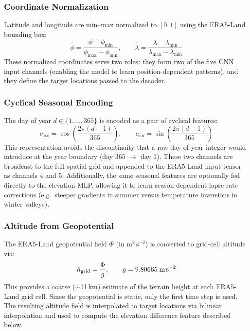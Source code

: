 \subsubsection{Coordinate Normalization}

Latitude and longitude are min--max normalized to $[0, 1]$ using the ERA5-Land bounding box:
%
\begin{equation}
    \hat{\phi} = \frac{\phi - \phi_{\min}}{\phi_{\max} - \phi_{\min}}, \qquad
    \hat{\lambda} = \frac{\lambda - \lambda_{\min}}{\lambda_{\max} - \lambda_{\min}}
\end{equation}
%
These normalized coordinates serve two roles: they form two of the five CNN input channels (enabling the model to learn position-dependent patterns), and they define the target locations passed to the decoder.

\subsubsection{Cyclical Seasonal Encoding}

The day of year $d \in \{1, \ldots, 365\}$ is encoded as a pair of cyclical features:
%
\begin{equation}
    c_{\cos} = \cos\!\left(\frac{2\pi(d-1)}{365}\right), \qquad
    c_{\sin} = \sin\!\left(\frac{2\pi(d-1)}{365}\right)
\end{equation}
%
This representation avoids the discontinuity that a raw day-of-year integer would introduce at the year boundary (day 365 $\rightarrow$ day 1). These two channels are broadcast to the full spatial grid and appended to the ERA5-Land input tensor as channels 4 and 5. Additionally, the same seasonal features are optionally fed directly to the elevation MLP, allowing it to learn season-dependent lapse rate corrections (e.g.\ steeper gradients in summer versus temperature inversions in winter valleys).

\subsubsection{Altitude from Geopotential}

The ERA5-Land geopotential field $\Phi$ (in m$^2$\,s$^{-2}$) is converted to grid-cell altitude via:
%
\begin{equation}
    h_{\text{grid}} = \frac{\Phi}{g}, \qquad g = 9.80665 \;\text{m\,s}^{-2}
\end{equation}
%
This provides a coarse ($\sim$11\,km) estimate of the terrain height at each ERA5-Land grid cell. Since the geopotential is static, only the first time step is used. The resulting altitude field is interpolated to target locations via bilinear interpolation and used to compute the elevation difference feature described below.

